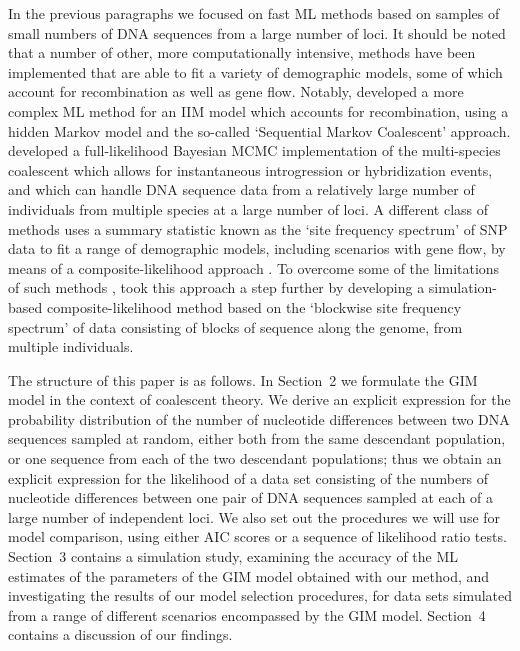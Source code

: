 \documentclass[11pt]{article}
\begin{document}
In the previous paragraphs we focused on fast ML methods 
based on samples of small numbers of DNA sequences from a large number of loci. It should be noted that
a number of other, more computationally intensive, methods have been implemented
that are able to fit a variety of demographic models, some of which account for recombination as well as gene flow. Notably, 
\citet{Mailund2012} developed a more complex ML method for an IIM model which accounts for recombination, using a hidden Markov model and the so-called `Sequential Markov Coalescent' approach. 
{\color{red} \citet{Flouri2020} developed a full-likelihood Bayesian MCMC implementation of the multi-species coalescent which allows for instantaneous introgression or hybridization events, and which can handle DNA sequence data from a relatively large number of individuals from multiple species at a large number of loci.}
A different class of methods uses a summary statistic known as the `site frequency spectrum' of SNP data to fit a range of demographic models, including scenarios with gene flow, by means of a composite-likelihood approach \citep[for example,][]{Gutenkunst2009, Naduvilezhath2011, Chen2012, Lukic2012, Excoffier2013, Kern2017}. To overcome some of the limitations of such methods \citep[discussed in][]{Terhorst2015}, 
\citet{Beeravolu2018} took this approach a step further by developing a simulation-based composite-likelihood method based on the `blockwise site frequency spectrum' of data consisting of blocks of sequence along the genome, from multiple individuals.

The structure of this paper is as follows. In Section~2 we formulate the GIM model in the context of coalescent theory. We derive an explicit expression for the probability distribution of the number of nucleotide differences between two DNA sequences sampled at random, either both from the same descendant population, or one sequence from each of the two descendant populations; thus we obtain an explicit expression for the likelihood of a data set consisting of the numbers of nucleotide differences between one pair of DNA sequences sampled at each of a large number of independent loci. We also set out the procedures we will use for model comparison, using either AIC scores or a sequence of likelihood ratio tests. Section~3 contains a simulation study, examining the accuracy of the ML estimates of the parameters of the GIM model obtained with our method, and investigating the results of our model selection procedures, 
for data sets simulated from a range of different scenarios encompassed by the GIM model. Section~4 contains a discussion of our findings.   
\end{document}
